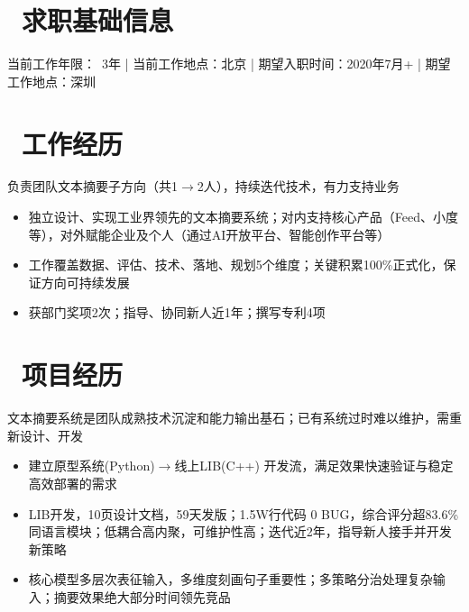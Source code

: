 \documentclass{resume}
\begin{document}




\section{\faUsers\ 求职基础信息}

当前工作年限：~3年 | 当前工作地点：北京 | 期望入职时间：2020年7月+ | 期望工作地点：深圳

\section{\faUsers\ 工作经历}

\begin{onehalfspacing}
负责团队文本摘要子方向（共1$ \rightarrow $2人），持续迭代技术，有力支持业务
\begin{itemize}
  \item 独立设计、实现工业界领先的文本摘要系统；对内支持核心产品（Feed、小度等），对外赋能企业及个人（通过AI开放平台、智能创作平台等）
  \item 工作覆盖数据、评估、技术、落地、规划5个维度；关键积累100\%正式化，保证方向可持续发展
  \item 获部门奖项2次；指导、协同新人近1年；撰写专利4项
\end{itemize}
\end{onehalfspacing}

\section{\faUsers\ 项目经历}
\begin{onehalfspacing}
文本摘要系统是团队成熟技术沉淀和能力输出基石；已有系统过时难以维护，需重新设计、开发
\begin{itemize}
  \item 建立原型系统(Python)$\rightarrow$线上LIB(C++) 开发流，满足效果快速验证与稳定高效部署的需求
  \item LIB开发，10页设计文档，59天发版；1.5W行代码 0 BUG，综合评分超83.6\%同语言模块；低耦合高内聚，可维护性高；迭代近2年，指导新人接手并开发新策略
  \item 核心模型多层次表征输入，多维度刻画句子重要性；多策略分治处理复杂输入；摘要效果绝大部分时间领先竞品
\end{itemize}
\end{onehalfspacing}
\end{document}
